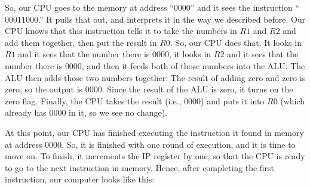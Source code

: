 \documentclass[../../../main.tex]{subfiles}
\begin{document}
So, our CPU goes to the memory at address ``$0000$'' and it sees the instruction ``$00011000$.'' It pulls that out, and interprets it in the way we described before. Our CPU knows that this instruction tells it to take the numbers in $R1$ and $R2$ and add them together, then put the result in $R0$. So, our CPU does that. It looks in $R1$ and it sees that the number there is $0000$, it looks in $R2$ and it sees that the number there is $0000$, and then it feeds both of those numbers into the ALU. The ALU then adds those two numbers together. The result of adding zero and zero is zero, so the output is $0000$. Since the result of the ALU is zero, it turns on the zero flag. Finally, the CPU takes the result (i.e., $0000$) and puts it into $R0$ (which already has $0000$ in it, so we see no change). 

At this point, our CPU has finished executing the instruction it found in memory at address $0000$. So, it is finished with one round of execution, and it is time to move on. To finish, it increments the \textsf{IP} register by one, so that the CPU is ready to go to the next instruction in memory. Hence, after completing the first instruction, our computer looks like this:
\end{document}
